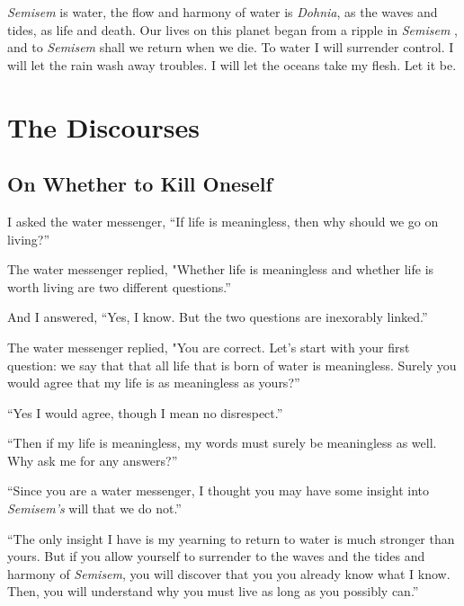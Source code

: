 \documentclass[12pt, letterpaper]{report}
\begin{document}
\textit{Semisem} is water, the flow and harmony of water is \textit{Dohnia}, as the waves and tides, as life and death. Our lives on this planet began from a ripple in \textit{Semisem} , and to \textit{Semisem} shall we return when we die. To water I will surrender control. I will let the rain wash away troubles. I will let the oceans take my flesh. Let it be.

\part{The Discourses}

\chapter{On Whether to Kill Oneself}

\vspace{1\baselineskip}
I asked the water messenger, ``If life is meaningless, then why should we go on living?''

\vspace{1\baselineskip}
The water messenger replied, "Whether life is meaningless and whether life is worth living are two different questions.''

\vspace{1\baselineskip}
And I answered, ``Yes, I know. But the two questions are inexorably linked.''

\vspace{1\baselineskip}
The water messenger replied, "You are correct. Let's start with your first question: we say that that all life that is born of water is meaningless. Surely you would agree that my life is as meaningless as yours?''

\vspace{1\baselineskip}
``Yes I would agree, though I mean no disrespect.''

\vspace{1\baselineskip}
``Then if my life is meaningless, my words must surely be meaningless as well. Why ask me for any answers?''

\vspace{1\baselineskip}
``Since you are a water messenger, I thought you may have some insight into \textit{Semisem's} will that we do not.''

\vspace{1\baselineskip}
``The only insight I have is my yearning to return to water is much stronger than yours. But if you allow yourself to surrender to the waves and the tides and harmony of \textit{Semisem}, you will discover that you you already know what I know. Then, you will understand why you must live as long as you possibly can.''
\end{document}
